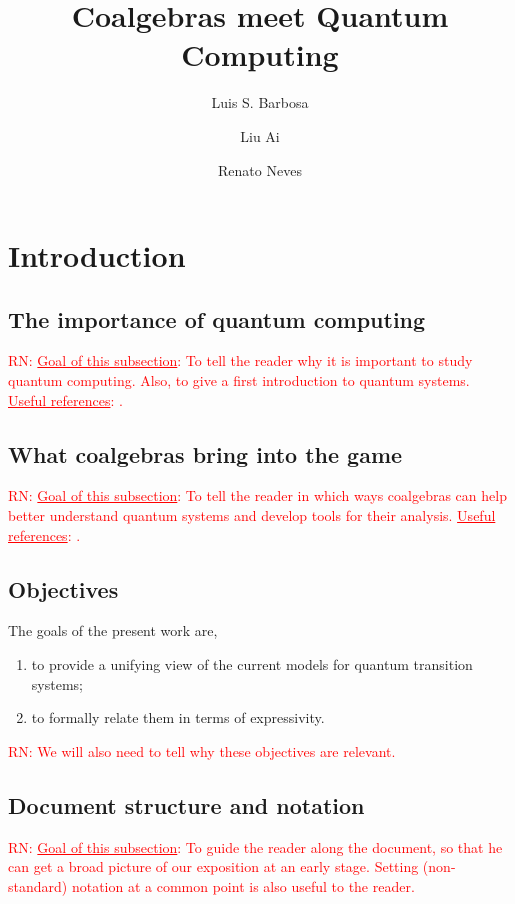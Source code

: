 \documentclass[a4paper, 11pt]{article}
\newcommand{\nevComment}[1]{\textcolor{red}{RN: #1}}
\begin{document}
\title{Coalgebras meet Quantum Computing}
\author{Luis S. Barbosa \and Liu Ai \and Renato Neves}
\maketitle

\section{Introduction}

\subsection{The importance of quantum computing}

\nevComment{\underline{Goal of this subsection}: To tell the reader
why it is important to study quantum computing. Also, to give a
first introduction to quantum systems.  \underline{Useful references}:
\cite{nielsen2002quantum,NM08,ying16}. }

\subsection{What coalgebras bring into the game}

\nevComment{\underline{Goal of this subsection}: To tell the reader
in which ways coalgebras can help better understand quantum systems and develop
tools for their analysis. \underline{Useful references}:
\cite{rutten2000,Jacobs16}. }

\subsection{Objectives}

The goals of the present work are,
\begin{enumerate}
\item to provide a unifying view of the
  current models for quantum transition systems;
\item to formally relate them in terms of expressivity.
\end{enumerate}
\nevComment{We will also need to tell why these objectives are relevant.}

\subsection{Document structure and notation}

\nevComment{\underline{Goal of this subsection}: To guide the reader
along the document, so that he can get a broad picture of our
exposition at an early stage. Setting (non-standard) notation at
a common point is also useful to the reader.}
\end{document}
